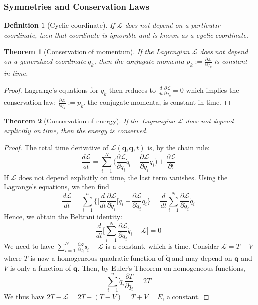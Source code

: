 \documentclass[a4paper]{article}
\newtheorem{defi}{Definition}[section]
\newtheorem{thm}{Theorem}[section]
\theoremstyle{new}
\begin{document}
\subsubsection{Symmetries and Conservation Laws}
\begin{defi}[Cyclic coordinate]
If $\mathcal{L}$ does not depend on a particular coordinate, then that coordinate is ignorable and is known as a cyclic coordinate.
\end{defi}
\begin{thm}[Conservation of momentum]
If the Lagrangian $\mathcal{L}$ does not depend on a generalized coordinate $q_k$, then the conjugate momenta $p_k:=\frac{\partial\mathcal{L}}{\partial\dot{q}_k}$ is constant in time.
\end{thm}
\begin{proof}
Lagrange's equations for $q_k$ then reduces to $\frac{d}{dt}\frac{\partial\mathcal{L}}{\partial\dot{q}_k}=0$ which implies the conservation law: $\frac{\partial\mathcal{L}}{\partial\dot{q}_k}:=p_k$, the conjugate momenta, is constant in time.
\end{proof}
\begin{thm}[Conservation of energy]
If the Lagrangian $\mathcal{L}$ does not depend explicitly on time, then the energy is conserved.
\end{thm}
\begin{proof}
The total time derivative of $\mathcal{L}(\mathbf{q},\mathbf{\dot{q}},t)$ is, by the chain rule:
$$\frac{d\mathcal{L}}{dt}=\sum_{i=1}^N\bigg(\frac{\partial\mathcal{L}}{\partial q_i}\dot{q}_i+\frac{\partial\mathcal{L}}{\partial\dot{q}_i}\ddot{q}_i\bigg)+\frac{\partial\mathcal{L}}{\partial t}$$
If $\mathcal{L}$ does not depend explicitly on time, the last term vanishes. Using the Lagrange's equations, we then find
$$\frac{d\mathcal{L}}{dt}=\sum_{i=1}^n\bigg\{\bigg[\frac{d}{dt}\frac{\partial\mathcal{L}}{\partial\dot{q}_i}\bigg]\dot{q}_i+\frac{\partial\mathcal{L}}{\partial\dot{q}_i}\ddot{q}_i\bigg\}=\frac{d}{dt}\sum_{i=1}^N\frac{\partial\mathcal{L}}{\partial\dot{q}_i}\dot{q}_i$$
Hence, we obtain the Beltrani identity:
$$\frac{d}{dt}\bigg[\sum_{i=1}^N\frac{\partial\mathcal{L}}{\partial\dot{q}_i}\dot{q}_i-\mathcal{L}\bigg]=0$$
We need to have $\sum_{i=1}^N\frac{\partial\mathcal{L}}{\partial\dot{q}_i}\dot{q}_i-\mathcal{L}$ is a constant, which is time. Consider $\mathcal{L}=T-V$ where $T$ is now a homogeneous quadratic function of $\mathbf{\dot{q}}$ and may depend on $\mathbf{q}$ and $V$ is only a function of $\mathbf{q}$. Then, by Euler's Theorem on homogeneous functions,
$$\sum_{i=1}^n\dot{q}_i\frac{\partial T}{\partial q_i}=2T$$
We thus have $2T-\mathcal{L}=2T-(T-V)=T+V=E$, a constant. 
\end{proof}
\end{document}
